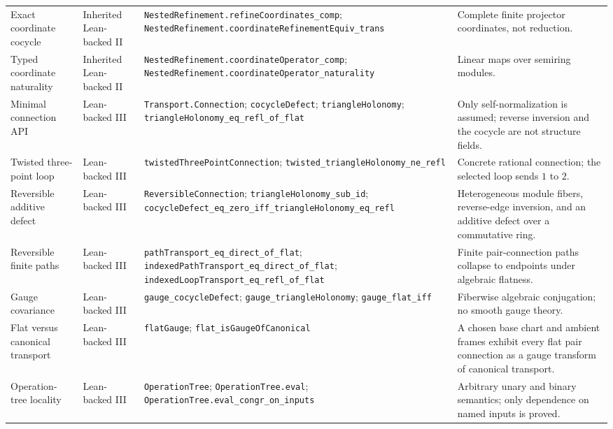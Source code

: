 \documentclass[11pt]{article}
\theoremstyle{definition}
\theoremstyle{remark}
\newcommand{\leanname}[1]{\nolinkurl{#1}}
\begin{document}
\begin{longtable}{L{0.17\textwidth}L{0.18\textwidth}L{0.25\textwidth}L{0.22\textwidth}}
\addlinespace
Exact coordinate cocycle
& Inherited Lean-backed II
& \leanname{NestedRefinement.refineCoordinates_comp}; \leanname{NestedRefinement.coordinateRefinementEquiv_trans}
& Complete finite projector coordinates, not reduction.\\
\addlinespace
Typed coordinate naturality
& Inherited Lean-backed II
& \leanname{NestedRefinement.coordinateOperator_comp}; \leanname{NestedRefinement.coordinateOperator_naturality}
& Linear maps over semiring modules.\\
\addlinespace
Minimal connection API
& Lean-backed III
& \leanname{Transport.Connection}; \leanname{cocycleDefect}; \leanname{triangleHolonomy}; \leanname{triangleHolonomy_eq_refl_of_flat}
& Only self-normalization is assumed; reverse inversion and the cocycle are not structure fields.\\
\addlinespace
Twisted three-point loop
& Lean-backed III
& \leanname{twistedThreePointConnection}; \leanname{twisted_triangleHolonomy_ne_refl}
& Concrete rational connection; the selected loop sends \(1\) to \(2\).\\
\addlinespace
Reversible additive defect
& Lean-backed III
& \leanname{ReversibleConnection}; \leanname{triangleHolonomy_sub_id}; \leanname{cocycleDefect_eq_zero_iff_triangleHolonomy_eq_refl}
& Heterogeneous module fibers, reverse-edge inversion, and an additive defect over a commutative ring.\\
\addlinespace
Reversible finite paths
& Lean-backed III
& \leanname{pathTransport_eq_direct_of_flat}; \leanname{indexedPathTransport_eq_direct_of_flat}; \leanname{indexedLoopTransport_eq_refl_of_flat}
& Finite pair-connection paths collapse to endpoints under algebraic flatness.\\
\addlinespace
Gauge covariance
& Lean-backed III
& \leanname{gauge_cocycleDefect}; \leanname{gauge_triangleHolonomy}; \leanname{gauge_flat_iff}
& Fiberwise algebraic conjugation; no smooth gauge theory.\\
\addlinespace
Flat versus canonical transport
& Lean-backed III
& \leanname{flatGauge}; \leanname{flat_isGaugeOfCanonical}
& A chosen base chart and ambient frames exhibit every flat pair connection as a gauge transform of canonical transport.\\
\addlinespace
Operation-tree locality
& Lean-backed III
& \leanname{OperationTree}; \leanname{OperationTree.eval}; \leanname{OperationTree.eval_congr_on_inputs}
& Arbitrary unary and binary semantics; only dependence on named inputs is proved.\\

\end{longtable}
\end{document}
